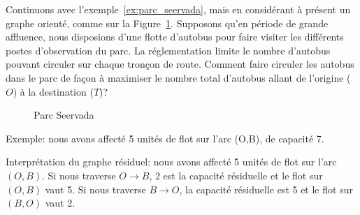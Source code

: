 \begin{example}
 Continuons avec l'exemple~\ref{ex:parc_seervada}, mais en considérant à présent un graphe orienté, comme sur la Figure~\ref{fig:seervada_directed}.
 Supposons qu'en période de grande affluence, nous disposions d'une flotte d'autobus pour faire visiter les différents postes d'observation du parc.
 La réglementation limite le nombre d'autobus pouvant circuler sur chaque tronçon de route.
 Comment faire circuler les autobus dans le parc de façon à maximiser le nombre total d'autobus allant de l'origine ($O$) à la destination ($T$)?

\begin{figure}[htbp]
\begin{center}
\caption{Parc Seervada}
\label{fig:seervada_directed}
\end{center}
\end{figure}

Exemple: nous avons affecté 5 unités de flot sur l'arc (O,B), de capacité 7.
\begin{center}

 
\end{center}

Interprétation du graphe résiduel: nous avons affecté 5 unités de flot sur l'arc $(O,B)$.
Si nous traverse $O \rightarrow B$, 2 est la capacité résiduelle et le flot sur $(O, B)$ vaut 5.
Si nous traverse $B \rightarrow O$, la capacité résiduelle est 5 et le flot sur $(B, O)$ vaut 2.

\end{example}

